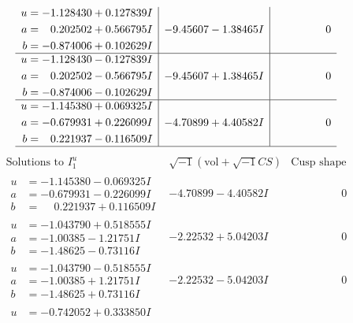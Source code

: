 \documentclass[1p]{elsarticle_modified}
\theoremstyle{definition}
\newcommand{\I}{\sqrt{-1}}
\begin{document}
$$\begin{array}{c|c|c}
\begin{aligned}
u &= -1.128430 + 0.127839 I \\
a &= \phantom{-}0.202502 + 0.566795 I \\
b &= -0.874006 + 0.102629 I\end{aligned}
 & -9.45607 - 1.38465 I & \phantom{-0.000000 } 0 \\ \hline\begin{aligned}
u &= -1.128430 - 0.127839 I \\
a &= \phantom{-}0.202502 - 0.566795 I \\
b &= -0.874006 - 0.102629 I\end{aligned}
 & -9.45607 + 1.38465 I & \phantom{-0.000000 } 0 \\ \hline\begin{aligned}
u &= -1.145380 + 0.069325 I \\
a &= -0.679931 + 0.226099 I \\
b &= \phantom{-}0.221937 - 0.116509 I\end{aligned}
 & -4.70899 + 4.40582 I & \phantom{-0.000000 } 0\\
 \hline 
 \end{array}$$\newpage$$\begin{array}{c|c|c}  
\text{Solutions to }I^u_{1}& \I (\text{vol} + \sqrt{-1}CS) & \text{Cusp shape}\\
 \hline 
\begin{aligned}
u &= -1.145380 - 0.069325 I \\
a &= -0.679931 - 0.226099 I \\
b &= \phantom{-}0.221937 + 0.116509 I\end{aligned}
 & -4.70899 - 4.40582 I & \phantom{-0.000000 } 0 \\ \hline\begin{aligned}
u &= -1.043790 + 0.518555 I \\
a &= -1.00385 - 1.21751 I \\
b &= -1.48625 - 0.73116 I\end{aligned}
 & -2.22532 + 5.04203 I & \phantom{-0.000000 } 0 \\ \hline\begin{aligned}
u &= -1.043790 - 0.518555 I \\
a &= -1.00385 + 1.21751 I \\
b &= -1.48625 + 0.73116 I\end{aligned}
 & -2.22532 - 5.04203 I & \phantom{-0.000000 } 0 \\ \hline\begin{aligned}
u &= -0.742052 + 0.333850 I \\

\end{aligned}
\end{array}$$
\end{document}
